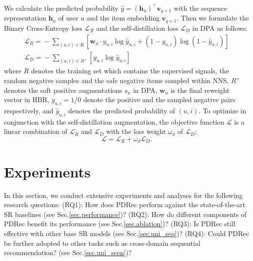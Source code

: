 \documentclass[letterpaper]{article} %
\begin{document}
We calculate the predicted probability $\hat{y}\!=\!(\bm{h}_u)^\top \bm{v}_{q+1}$ with the sequence representation $\bm{h}_u$ of user $u$ and the item embedding $\bm{v}_{q+1}$. Then we formulate the Binary Cross-Entropy loss $\mathcal{L_{R}}$ and the self-distillation loss $\mathcal{L}_{D}$ in DPA as follows:
\begin{gather}
    \mathcal{L}_{R}\!=\!-\!\sum_{(u,i)\in \!R}\!\left[\bm{w}_u\!\cdot\!y_{u,i}\!\log \hat{y}_{u,i}\!+\!\left(1\!-\!y_{u,i}\right)\!\log\!\left(\!1\!-\!\hat{y}_{u,i}\!\right)\!\right]\\
    \mathcal{L}_{D}\!=\!-\!\sum_{(u,i) \in R^{+}} \left[y_{u,i}\!\log\!\hat{y}_{u, i}\right]
    \label{eq.L_CTR}
\end{gather}
where $R$ denotes the training set which contains the supervised signals, the random negative samples and the safe negative items sampled within NNS, $R^{+}$ denotes the soft positive augmentations $\!s_{u}\!$ in DPA, $\!\bm{w}_u\!$ is the final reweight vector in HBR, $y_{u,i}\!=\!1\slash0$ denote the positive and the sampled negative pairs respectively, and $\!\hat{y}_{u,i}\!$ denotes the predicted probability of $\!(u,i)$. To optimize in conjunction with the self-distillation augmentation, the objective function $\mathcal{L}$ is a linear combination of $\mathcal{L}_{R}$ and $\mathcal{L}_{D}$ with the loss weight $\omega_d$ of $\mathcal{L}_{D}$:
\begin{equation}
    \mathcal{L} = \mathcal{L}_{R} + \omega_d \mathcal{L}_{D}.
\end{equation}


% 
\section{Experiments}
In this section, we conduct extensive experiments and analyses for the following research questions: 
(RQ1): How does PDRec perform against the state-of-the-art SR baselines (see Sec.\ref{sec.performance})? 
(RQ2): How do different components of PDRec benefit its performance (see Sec.\ref{sec.ablation})?
(RQ3): Is PDRec still effective with other base SR models (see Sec.\ref{sec.uni_seq})?
(RQ4): Could PDRec be further adopted to other tasks such as cross-domain sequential recommendation? (see Sec.\ref{sec.uni_scen})?
\end{document}
